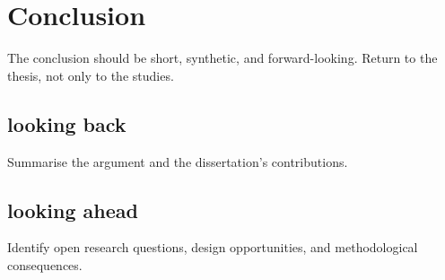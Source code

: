 \chapter{Conclusion}\label{ch:conclusion}

\begin{synopsis}
The conclusion should be short, synthetic, and forward-looking. Return to the thesis, not only to the studies.
\end{synopsis}

\section{looking back}
Summarise the argument and the dissertation's contributions.

\section{looking ahead}
Identify open research questions, design opportunities, and methodological consequences.
